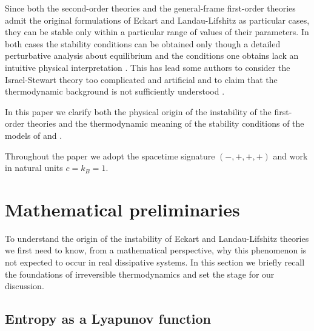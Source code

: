 \documentclass[a4paper, amsfonts, amssymb, amsmath, reprint, showkeys, nofootinbib, twoside]{revtex4-1}
\begin{document}
Since both the second-order theories and the general-frame first-order theories admit the original formulations of Eckart and Landau-Lifshitz as particular cases, they can be stable only within a particular range of values of their parameters. 
In both cases the stability conditions can be obtained only though a detailed perturbative analysis about equilibrium \citep{Hishcock1983,Hoult2020} and the conditions one obtains lack an intuitive physical interpretation \citep{Poovuttikul2019}. This has lead some authors to consider the Israel-Stewart theory too complicated and artificial and to claim that the thermodynamic background is not sufficiently understood \citep{Van2012}. 

In this paper we clarify both the physical origin of the instability of the first-order theories and the thermodynamic meaning of the stability conditions of the models of \citet{Israel_Stewart_1979} and \citet{Bemfica_2019_nonlinear}. 

Throughout the paper we adopt the spacetime signature $ ( - , +, + , + ) $ and work in natural units $c=k_B=1$. 


\section{Mathematical preliminaries}

To understand the origin of the instability of Eckart and Landau-Lifshitz theories we first need to know, from a mathematical perspective, why this phenomenon is not expected to occur in real dissipative systems. In this section we briefly recall the foundations of irreversible thermodynamics and set the stage for our discussion.

\subsection{Entropy as a Lyapunov function}
\label{SonoLya}
\end{document}

